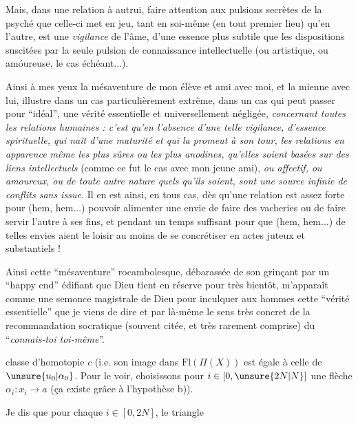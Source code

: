 Mais, dans une relation à autrui, faire attention aux pulsions secrètes de la psyché que celle-ci met en jeu, tant en soi-même (en tout premier lieu) qu'en l'autre, est une \textit{vigilance} de l'âme, d'une essence plus subtile que les dispositions suscitées par la seule pulsion de connaissance intellectuelle (ou artistique, ou amóureuse, le cas échéant...).

Ainsi à mes yeux la mésaventure de mon élève et ami avec moi, et la mienne avec lui, illustre dans un cas particulièrement extrême, dans un cas qui peut passer pour ``idéal'', une vérité essentielle et universellement négligée, \textit{concernant toutes les relations humaines : c'est\unsure{,} qu'en l'absence d'une telle vigilance, d'essence spirituelle, qui naît d'une maturité et qui la promeut à son tour, les relations en apparence même les plus sûres ou les plus anodines, qu'elles soient basées sur des liens intellectuels} (comme ce fut le cas avec mon jeune ami), \textit{ou affectif, ou amoureux, ou de toute autre nature quels qu'ils soient, sont une source infinie de conflits sans issue.} Il en est ainsi, en tous cas, dès qu'une relation est assez forte pour (hem, hem...) pouvoir alimenter une envie de faire des vacheries ou de faire servir l'autre à ses fins, et pendant un temps suffisant pour que (hem, hem...) de telles envies aient le loisir au moins de se concrétiser en actes juteux et substantiels !

Ainsi cette ``mésaventure'' rocambolesque, débarassée de son grinçant par un ``happy end'' édifiant que Dieu tient en réserve pour très bientôt, m'apparaît comme une semonce magistrale de Dieu pour inculquer aux hommes cette ``vérité essentielle'' que je viens de dire et par là-même le sens très concret de la recommandation socratique (souvent citée, et très rarement comprise) du ``\textit{connais-toi toi-même}''.


classe d'homotopie  $c$ (i.e. son image dans $\mathrm{Fl}(\Pi(X))$ est égale à celle de $\unsure{u_0|\alpha_0}$. Pour le voir, choisissons pour  $i\in[0,\unsure{2N|N}]$ une flèche $\alpha_i:x_i\longrightarrow a$  (ça existe grâce à l'hypothèse b)).

Je dis que pour chaque $i\in[0,2N]$, le triangle



